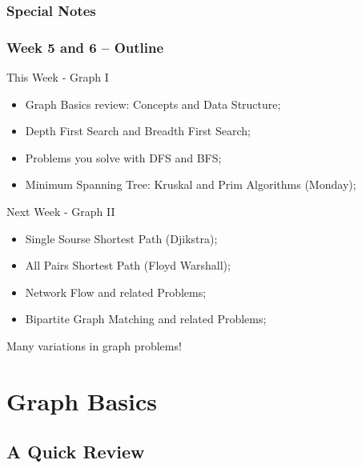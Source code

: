 \documentclass{beamer}
\begin{document}
\begin{frame}
  \frametitle{Special Notes}
\end{frame}

\begin{frame}
  \frametitle{Week 5 and 6 -- Outline}
  {\smaller
  \begin{block}{This Week - Graph I}
    \begin{itemize}
    \item Graph Basics review: Concepts and Data Structure;
    \item Depth First Search and Breadth First Search;
    \item Problems you solve with DFS and BFS;
    \item Minimum Spanning Tree: Kruskal and Prim Algorithms \alert{(Monday)};
     \end{itemize}
  \end{block}
  \begin{block}{Next Week - Graph II}
    \begin{itemize}
    \item Single Sourse Shortest Path (Djikstra);
    \item All Pairs Shortest Path (Floyd Warshall);   
    \item Network Flow and related Problems;
    \item Bipartite Graph Matching and related Problems;
    \end{itemize}
  \end{block}}
  Many variations in graph problems!
\end{frame}

\section{Graph Basics}
\subsection{A Quick Review}
\end{document}
